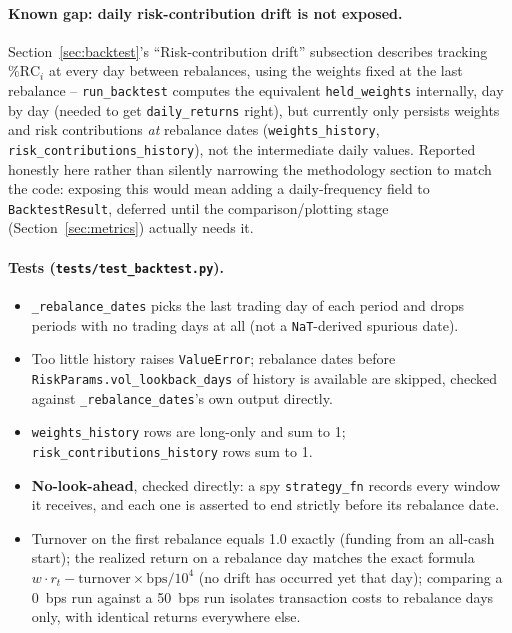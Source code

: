 \documentclass[11pt]{article}
\begin{document}
\paragraph{Known gap: daily risk-contribution drift is not exposed.}
Section~\ref{sec:backtest}'s ``Risk-contribution drift'' subsection
describes tracking $\%\text{RC}_i$ at every day between rebalances,
using the weights fixed at the last rebalance -- \texttt{run\_backtest}
computes the equivalent \texttt{held\_weights} internally, day by day
(needed to get \texttt{daily\_returns} right), but currently only
persists weights and risk contributions \emph{at} rebalance dates
(\texttt{weights\_history}, \texttt{risk\_contributions\_history}), not
the intermediate daily values. Reported honestly here rather than
silently narrowing the methodology section to match the code: exposing
this would mean adding a daily-frequency field to
\texttt{BacktestResult}, deferred until the comparison/plotting stage
(Section~\ref{sec:metrics}) actually needs it.

\paragraph{Tests (\texttt{tests/test\_backtest.py}).}
\begin{itemize}
    \item \texttt{\_rebalance\_dates} picks the last trading day of each
    period and drops periods with no trading days at all (not a
    \texttt{NaT}-derived spurious date).
    \item Too little history raises \texttt{ValueError}; rebalance dates
    before \texttt{RiskParams.vol\_lookback\_days} of history is
    available are skipped, checked against \texttt{\_rebalance\_dates}'s
    own output directly.
    \item \texttt{weights\_history} rows are long-only and sum to 1;
    \texttt{risk\_contributions\_history} rows sum to 1.
    \item \textbf{No-look-ahead}, checked directly: a spy
    \texttt{strategy\_fn} records every window it receives, and each one
    is asserted to end strictly before its rebalance date.
    \item Turnover on the first rebalance equals 1.0 exactly (funding
    from an all-cash start); the realized return on a rebalance day
    matches the exact formula $w \cdot r_t - \text{turnover} \times
    \text{bps}/10^4$ (no drift has occurred yet that day); comparing a
    0~bps run against a 50~bps run isolates transaction costs to
    rebalance days only, with identical returns everywhere else.
\end{itemize}
\end{document}
